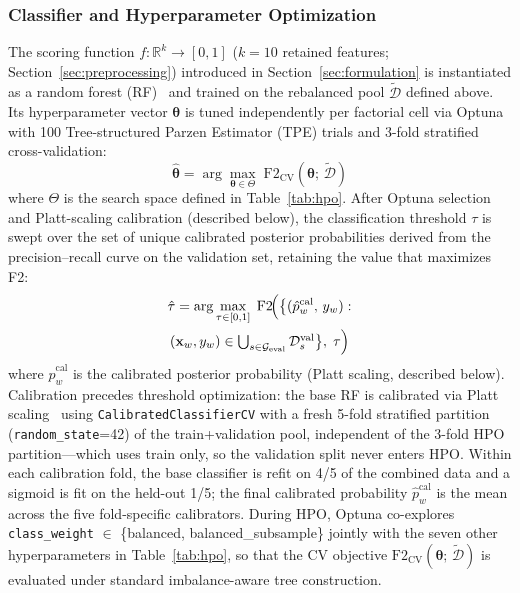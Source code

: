 \documentclass[lettersize,journal]{IEEEtran}
\begin{document}
\subsubsection{Classifier and Hyperparameter Optimization}\label{sec:classifier}
The scoring function $f\colon \mathbb{R}^k \to [0,1]$ ($k = 10$ retained features; Section~\ref{sec:preprocessing}) introduced in Section~\ref{sec:formulation} is instantiated as a random forest (RF)~\cite{breiman2001} and trained on the rebalanced pool $\tilde{\mathcal{D}}$ defined above.
Its hyperparameter vector $\boldsymbol{\theta}$ is tuned independently per factorial cell via Optuna~\cite{akiba2019} with 100 Tree-structured Parzen Estimator (TPE) trials and 3-fold stratified cross-validation:
\begin{equation}
\label{eq:hpo}
\hat{\boldsymbol{\theta}} = \arg\max_{\boldsymbol{\theta} \in \Theta}\;
  \mathrm{F2}_{\mathrm{CV}}(\boldsymbol{\theta};\, \tilde{\mathcal{D}})
\end{equation}
where $\Theta$ is the search space defined in Table~\ref{tab:hpo}.
After Optuna selection and Platt-scaling calibration (described below), the classification threshold $\tau$ is swept over the set of unique calibrated posterior probabilities derived from the precision--recall curve on the validation set, retaining the value that maximizes F2:
\begin{multline}
\label{eq:threshold}
\hat{\tau} = \arg\max_{\tau \in [0,1]}\;
  \mathrm{F2}\!\Bigl(\bigl\{ (\hat{p}_w^{\mathrm{cal}},\, y_w) :\\
  (\mathbf{x}_w, y_w) \in \textstyle\bigcup_{s \in \mathcal{G}_{\mathrm{eval}}} \mathcal{D}_s^{\mathrm{val}} \bigr\},\; \tau\Bigr)
\end{multline}
where $\hat{p}_w^{\mathrm{cal}}$ is the calibrated posterior probability (Platt scaling, described below).
Calibration precedes threshold optimization: the base RF is calibrated via Platt scaling~\cite{platt1999} using \texttt{CalibratedClassifierCV} with a fresh 5-fold stratified partition (\texttt{random\_state}=42) of the train+validation pool, independent of the 3-fold HPO partition---which uses train only, so the validation split never enters HPO. Within each calibration fold, the base classifier is refit on 4/5 of the combined data and a sigmoid is fit on the held-out 1/5; the final calibrated probability $\hat{p}_w^{\mathrm{cal}}$ is the mean across the five fold-specific calibrators.
During HPO, Optuna co-explores \texttt{class\_weight} $\in$ \{balanced, balanced\_subsample\} jointly with the seven other hyperparameters in Table~\ref{tab:hpo}, so that the CV objective $\mathrm{F2}_{\mathrm{CV}}(\boldsymbol{\theta};\,\tilde{\mathcal{D}})$ is evaluated under standard imbalance-aware tree construction.
\end{document}
